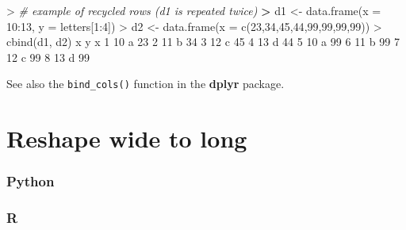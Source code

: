 \documentclass[
]{book}
\newenvironment{Shaded}{\begin{snugshade}}{\end{snugshade}}
\newcommand{\AttributeTok}[1]{\textcolor[rgb]{0.77,0.63,0.00}{#1}}
\newcommand{\CommentTok}[1]{\textcolor[rgb]{0.56,0.35,0.01}{\textit{#1}}}
\newcommand{\DecValTok}[1]{\textcolor[rgb]{0.00,0.00,0.81}{#1}}
\newcommand{\ErrorTok}[1]{\textcolor[rgb]{0.64,0.00,0.00}{\textbf{#1}}}
\newcommand{\FunctionTok}[1]{\textcolor[rgb]{0.00,0.00,0.00}{#1}}
\newcommand{\NormalTok}[1]{#1}
\newcommand{\OtherTok}[1]{\textcolor[rgb]{0.56,0.35,0.01}{#1}}
\newcommand{\SpecialCharTok}[1]{\textcolor[rgb]{0.00,0.00,0.00}{#1}}
\begin{document}
\begin{Shaded}
\begin{Highlighting}[]
\SpecialCharTok{\textgreater{}} \CommentTok{\# example of recycled rows (d1 is repeated twice)}
\ErrorTok{\textgreater{}}\NormalTok{ d1 }\OtherTok{\textless{}{-}} \FunctionTok{data.frame}\NormalTok{(}\AttributeTok{x =} \DecValTok{10}\SpecialCharTok{:}\DecValTok{13}\NormalTok{, }\AttributeTok{y =}\NormalTok{ letters[}\DecValTok{1}\SpecialCharTok{:}\DecValTok{4}\NormalTok{])}
\SpecialCharTok{\textgreater{}}\NormalTok{ d2 }\OtherTok{\textless{}{-}} \FunctionTok{data.frame}\NormalTok{(}\AttributeTok{x =} \FunctionTok{c}\NormalTok{(}\DecValTok{23}\NormalTok{,}\DecValTok{34}\NormalTok{,}\DecValTok{45}\NormalTok{,}\DecValTok{44}\NormalTok{,}\DecValTok{99}\NormalTok{,}\DecValTok{99}\NormalTok{,}\DecValTok{99}\NormalTok{,}\DecValTok{99}\NormalTok{))}
\SpecialCharTok{\textgreater{}} \FunctionTok{cbind}\NormalTok{(d1, d2)}
\NormalTok{   x y  x}
\DecValTok{1} \DecValTok{10}\NormalTok{ a }\DecValTok{23}
\DecValTok{2} \DecValTok{11}\NormalTok{ b }\DecValTok{34}
\DecValTok{3} \DecValTok{12}\NormalTok{ c }\DecValTok{45}
\DecValTok{4} \DecValTok{13}\NormalTok{ d }\DecValTok{44}
\DecValTok{5} \DecValTok{10}\NormalTok{ a }\DecValTok{99}
\DecValTok{6} \DecValTok{11}\NormalTok{ b }\DecValTok{99}
\DecValTok{7} \DecValTok{12}\NormalTok{ c }\DecValTok{99}
\DecValTok{8} \DecValTok{13}\NormalTok{ d }\DecValTok{99}
\end{Highlighting}
\end{Shaded}

See also the \texttt{bind\_cols()} function in the \textbf{dplyr} package.

\hypertarget{reshape-wide-to-long}{%
\section{Reshape wide to long}\label{reshape-wide-to-long}}

\hypertarget{python-25}{%
\subsubsection*{Python}\label{python-25}}

\hypertarget{r-25}{%
\subsubsection*{R}\label{r-25}}
\end{document}
